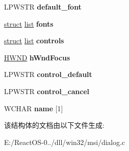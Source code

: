 \begin{DoxyCompactItemize}
L\+P\+W\+S\+TR {\bfseries default\+\_\+font}
\item 
\mbox{\label{structmsi__dialog__tag_ad8d4915590121d5546917c2bd5447784}} 
\hyperlink{interfacestruct}{struct} \hyperlink{classlist}{list} {\bfseries fonts}
\item 
\mbox{\label{structmsi__dialog__tag_a2dc6434a4ba929b380fe3d305ba61406}} 
\hyperlink{interfacestruct}{struct} \hyperlink{classlist}{list} {\bfseries controls}
\item 
\mbox{\label{structmsi__dialog__tag_a2c6b075104e3a505409dbdd1ab1b7c1a}} 
\hyperlink{interfacevoid}{H\+W\+ND} {\bfseries h\+Wnd\+Focus}
\item 
\mbox{\label{structmsi__dialog__tag_aa868800016207e13beab690f5531b560}} 
L\+P\+W\+S\+TR {\bfseries control\+\_\+default}
\item 
\mbox{\label{structmsi__dialog__tag_a829e48660390e6ddbc4f571000dffa56}} 
L\+P\+W\+S\+TR {\bfseries control\+\_\+cancel}
\item 
\mbox{\label{structmsi__dialog__tag_af664bae1e720ca5ac796b906115ff5ad}} 
W\+C\+H\+AR {\bfseries name} \mbox{[}1\mbox{]}
\end{DoxyCompactItemize}


该结构体的文档由以下文件生成\+:\begin{DoxyCompactItemize}
\item 
E\+:/\+React\+O\+S-\/0../dll/win32/msi/dialog.\+c\end{DoxyCompactItemize}
